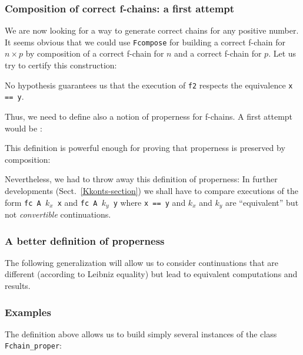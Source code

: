 
\subsubsection{Composition of correct f-chains: a first attempt}

We are now looking for a way to generate correct chains for any positive 
number. It seems obvious that we could use \texttt{Fcompose} for building 
a correct f-chain for $n\times p$ by composition of a correct f-chain for 
$n$ and a correct f-chain for $p$.
Let us try to certify this construction:



No hypothesis guarantees us that the execution of \texttt{f2} respects the equivalence
\texttt{x == y}.


 Thus, we need to define also a  notion of properness for f-chains. 
A first attempt would be :




This definition is powerful enough for proving that properness is 
preserved by composition:


Nevertheless, we had to throw away  this definition of properness:
In further 
developments (Sect.~\vref{Kkonts-section})  we shall  have to compare
executions of the form \texttt{fc A $k_x$ x} and \texttt{fc A $k_y$ y}
where \texttt{x == y} and {$k_x$} and {$k_y$} are 
``equivalent''
but not \emph{convertible} continuations.


\subsubsection{A better definition of properness}

 The following  generalization will allow us to consider continuations that are
different (according to Leibniz equality) but lead to equivalent
computations and results.


\subsubsection{Examples}
The definition above allows us  to build simply several instances of the class \linebreak
\texttt{Fchain\_proper}:

